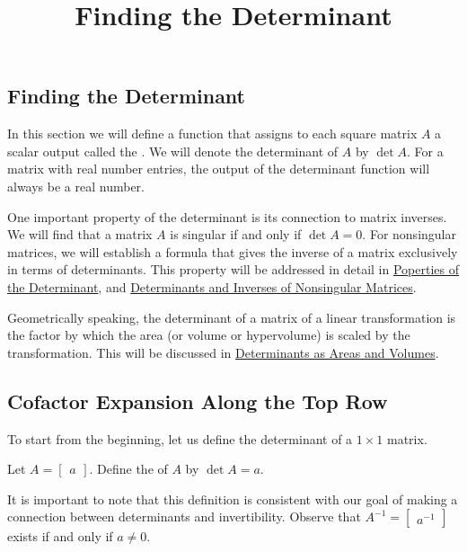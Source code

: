 \documentclass{ximera}
\title{Finding the Determinant} \license{CC BY-NC-SA 4.0}
\begin{document}
\begin{abstract}

\end{abstract}
\maketitle

\begin{onlineOnly}
\section*{Finding the Determinant}
\end{onlineOnly}

In this section we will define a function that assigns to each square matrix $A$ a scalar output called the .  We will denote the determinant of $A$ by $\det{A}$.  For a matrix with real number entries, the output of the determinant function will always be a real number.

One important property of the determinant is its connection to matrix inverses.  We will find that a matrix $A$ is singular if and only if $\det{A}=0$.  For nonsingular matrices, we will establish a formula that gives the inverse of a matrix exclusively in terms of determinants.  This property will be addressed in detail in \href{\xmbaseurl/DET-0040/main}{Poperties of the Determinant}, and \href{\xmbaseurl/DET-0060/main}{Determinants and Inverses of Nonsingular Matrices}.

Geometrically speaking, the determinant of a matrix of a linear transformation is the factor by which the area (or volume or hypervolume) is scaled by the transformation.  This will be discussed in \href{\xmbaseurl/DET-0070/main}{Determinants as Areas and Volumes}. 

\subsection*{Cofactor Expansion Along the Top Row}
To start from the beginning, let us define the determinant of a $1\times 1$ matrix.

\begin{definition}\label{def:onebyonedet} Let
$A=\begin{bmatrix}a\end{bmatrix}$.  Define the  of $A$ by $\det{A}=a$.
\end{definition}
It is important to note that this definition is consistent with our goal of making a connection between determinants and invertibility.  Observe that $A^{-1}=\begin{bmatrix}a^{-1}\end{bmatrix}$ exists if and only if $a\neq 0$.
\end{document}
